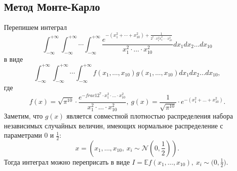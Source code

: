 \documentclass[11pt]{article}
\numberwithin{equation}{section}
\begin{document}
\subsection{Метод Монте-Карло}
Перепишем интеграл
$$ \int_{-\infty}^{+\infty} \int_{-\infty}^{+\infty} \cdots \int_{-\infty}^{+\infty} \frac{e^{-(x_1^2+\cdots+x_{10}^2)+\frac{1}{2^7 \cdot x_1^2 \dot x_1^2 \cdots \cdot x_{10}^2}   }}{x_1^2 \cdot \dots \cdot x_{10}^2} dx_1 dx_2 \dots dx_{10}$$
в виде 
$$ \int_{-\infty}^{+\infty} \int_{-\infty}^{+\infty} \cdots \int_{-\infty}^{+\infty} f(x_1, \dots, x_{10})g(x_1, \dots, x_{10}) dx_1 dx_2 \dots dx_{10},$$
где 
$$ f(x) = \sqrt{\pi^{10}} \cdot \frac{e^{-frac{1}{2^7 \cdot x_1^2 \cdot \dots \cdot x_10^2} }} {x_1^2 \cdot \dots \cdot x_10^2}, \ g(x) = \frac{1}{\sqrt{\pi^10}} \cdot e^{-(x_1^2+\dots+x_{10}^2)}.$$
Заметим, что $g(x)$ является совместной плотностью распределения набора независимых случайных величин, имеющих нормальное распределение с параметрами 0 и $\frac{1}{2}:$
$$ x = (x_1, \dots, x_{10}, \ x_i \sim \mathcal{N}(0,\frac{1}{2})).$$
Тогда интеграл можно переприсать в виде 
$I = \mathbb{E} f(x_1, \dots, x_{10}), \ x_i \sim \mathcal(0, \frac{1}{2}).$
\end{document}
